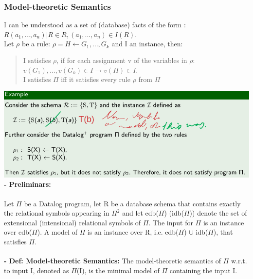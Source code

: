 \documentclass{article}
\begin{document}
\subsubsection{Model-theoretic Semantics}
I can be understood as a set of (database) facts of the form : ${R(a_1,...,a_n)|R \in R,(a_1,...,a_n)\in I(R)}$.\\
Let $\rho$ be a rule: $\rho=H \leftarrow G_1,...,G_k$ and I an instance, then:\\
\begin{quote}
I satisfies $\rho$, if for each assignment v of the variables in $\rho$: $v(G_1),...,v(G_k)\in I \rightarrow v(H)\in I$.\\
I satisfies $\Pi$ iff it satisfies every rule $\rho$ from $\Pi$
\end{quote}
\includegraphics[scale=0.3]{83.png}\\
\textbf{- Preliminars:}\\\\
Let $\Pi$ be a Datalog program, let R be a database schema that contains exactly the relational symbols appearing in $\Pi^2$ and let edb($\Pi$) (idb($\Pi$)) denote the set of extensional
(intensional) relational symbols of $\Pi$. The input for $\Pi$ is an instance over edb($\Pi$).
A model of $\Pi$ is an instance over R, i.e. edb($\Pi$) $\cup$ idb($\Pi$), that satisfies $\Pi$.\\\\
\textbf{- Def: Model-theoretic Semantics: }The model-theoretic semantics of $\Pi$ w.r.t. to input I, denoted as $\Pi$(I), is the minimal model of $\Pi$ containing the input I.
\end{document}
